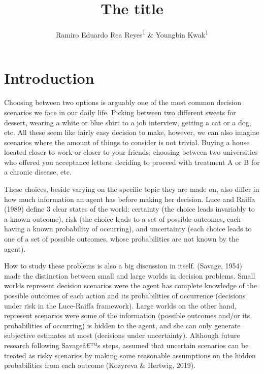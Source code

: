 \documentclass[
  english,
  man]{apa6}
\title{The title}
\author{Ramiro Eduardo Rea Reyes\textsuperscript{1} \& Youngbin Kwak\textsuperscript{1}}
\date{}
\affiliation{\vspace{0.5cm}\textsuperscript{1} University of Massachusetts, Amherst}
\begin{document}
\maketitle

\hypertarget{introduction}{%
\section{Introduction}\label{introduction}}

Choosing between two options is arguably one of the most common decision scenarios we face in our daily life. Picking between two different sweets for dessert, wearing a white or blue shirt to a job interview, getting a cat or a dog, etc. All these seem like fairly easy decision to make, however, we can also imagine scenarios where the amount of things to consider is not trivial. Buying a house located closer to work or closer to your friends; choosing between two universities who offered you acceptance letters; deciding to proceed with treatment A or B for a chronic disease, etc.

These choices, beside varying on the specific topic they are made on, also differ in how much information an agent has before making her decision. Luce and Raiffa (1989) define 3 clear states of the world: certainty (the choice leads invariably to a known outcome), risk (the choice leads to a set of possible outcomes, each having a known probability of occurring), and uncertainty (each choice leads to one of a set of possible outcomes, whose probabilities are not known by the agent).

How to study these problems is also a big discussion in itself. (Savage, 1954) made the distinction between small and large worlds in decision problems. Small worlds represent decision scenarios were the agent has complete knowledge of the possible outcomes of each action and its probabilities of occurrence (decisions under risk in the Luce-Raiffa framework). Large worlds on the other hand, represent scenarios were some of the information (possible outcomes and/or its probabilities of occurring) is hidden to the agent, and she can only generate subjective estimates at most (decisions under uncertainty). Although future research following Savageâ€™s steps, assumed that uncertain scenarios can be treated as risky scenarios by making some reasonable assumptions on the hidden probabilities from each outcome (Kozyreva \& Hertwig, 2019).
\end{document}
